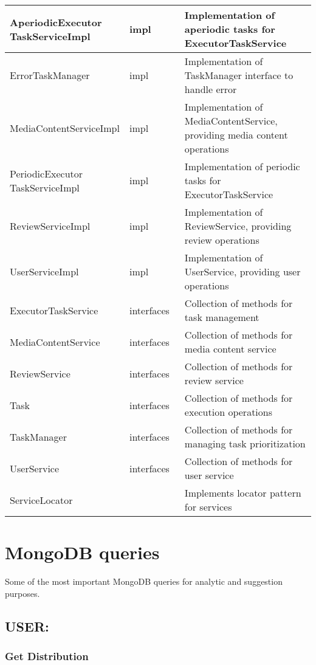 \begin{longtable}{|>{\raggedright\arraybackslash}m{0.3\linewidth}|>{\raggedright\arraybackslash}m{0.2\linewidth}|>{\raggedright\arraybackslash}m{0.5\linewidth}|}
    \hline
    AperiodicExecutor TaskServiceImpl & impl & Implementation of aperiodic tasks for ExecutorTaskService \\
    \hline
    ErrorTaskManager & impl & Implementation of TaskManager interface to handle error \\
    \hline
    MediaContentServiceImpl & impl & Implementation of MediaContentService, providing media content operations \\
    \hline
    PeriodicExecutor TaskServiceImpl & impl & Implementation of periodic tasks for ExecutorTaskService \\
    \hline
    ReviewServiceImpl & impl & Implementation of ReviewService, providing review operations \\
    \hline
    UserServiceImpl & impl & Implementation of UserService, providing user operations \\
    \hline
    ExecutorTaskService & interfaces & Collection of methods for task management \\
    \hline
    MediaContentService & interfaces & Collection of methods for media content service \\
    \hline
    ReviewService & interfaces & Collection of methods for review service \\
    \hline
    Task & interfaces & Collection of methods for execution operations \\
    \hline
    TaskManager & interfaces & Collection of methods for managing task prioritization \\
    \hline
    UserService & interfaces & Collection of methods for user service \\
    \hline
    ServiceLocator & & Implements locator pattern for services \\
    \hline
\end{longtable}

\section {MongoDB queries}
Some of the most important MongoDB queries for analytic and suggestion purposes. 

\subsection*{USER:}
\subsubsection*{Get Distribution}

